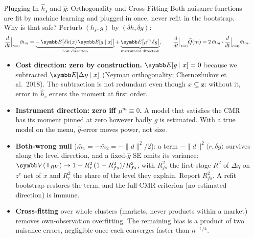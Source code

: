 \documentclass[aspectratio=169,10pt]{beamer}
\begin{document}
\begin{frame}{Plugging In $\widehat h_s$ and $\widehat g$: Orthogonality and Cross-Fitting}
\footnotesize
Both nuisance functions are fit by machine learning and \alert{plugged in once}, never refit in the bootstrap. Why is that safe? Perturb $(h_s, g)$ by $(\delta h, \delta g)$:
\begin{align*}
\frac{d}{dt}\Big|_{t=0} \bar m_m = \underbrace{-\,\E\big[\delta h(x)\, \E[g \mid x]\big]}_{\text{cost direction}} + \underbrace{\E\big[\mu^m\, \delta g\big]}_{\text{instrument direction}},
\qquad
\frac{d}{dt}\Big|_{t=0} \widetilde Q(m) = 2\, \bar m_m \cdot \frac{d}{dt}\Big|_{t=0} \bar m_m .
\end{align*}
\begin{itemize}
\item \textbf{Cost direction: zero by construction.} $\E[g \mid x] = 0$ because we subtracted $\E[\Delta\eta \mid x]$ (Neyman orthogonality; Chernozhukov et al.\ 2018). The subtraction is not redundant even though $x \subseteq \symbf{z}$: without it, error in $\widehat h_s$ enters the moment at first order.
\item \textbf{Instrument direction: zero iff $\mu^m \equiv 0$.} A model that satisfies the CMR has its moment pinned at zero however badly $g$ is estimated. With a true model on the menu, $\widehat g$-error moves \alert{power}, not size.
\item \textbf{Both-wrong null} ($\bar m_1 = -\bar m_2 = -\|d\|^2/2$): a term $-\|d\|^2 \langle r, \delta g \rangle$ survives along the level direction, and a fixed-$\widehat g$ SE omits its variance: $\Var(\mathsf{T}_{RV}) \rightarrow 1 + R^2_r\,(1 - R^2_{fs})/R^2_{fs}$, with $R^2_{fs}$ the first-stage $R^2$ of $\Delta\eta$ on $z^e$ net of $x$ and $R^2_r$ the share of the level they explain. Report $R^2_{fs}$. A refit bootstrap restores the term, and the full-CMR criterion (no estimated direction) is immune.
\item \textbf{Cross-fitting} over whole clusters (markets, never products within a market) removes own-observation overfitting. The remaining bias is a product of two nuisance errors, negligible once each converges faster than $n^{-1/4}$.
\end{itemize}
\end{frame}
\end{document}
